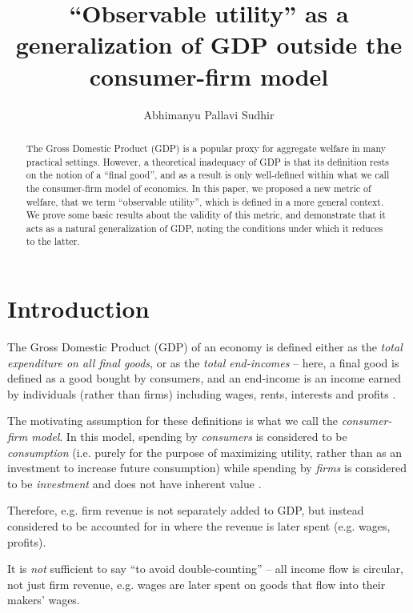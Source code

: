 \documentclass[smallextended]{svjour3}
\title{``Observable utility'' as a generalization of GDP outside the consumer-firm model}
\author{Abhimanyu Pallavi Sudhir}
\institute{Department of Mathematics, Imperial College London}
\begin{document}
\maketitle

\begin{abstract}
    The Gross Domestic Product (GDP) is a popular proxy for aggregate welfare in many practical settings. However, a theoretical inadequacy of GDP is that its definition rests on the notion of a ``final good'', and as a result is only well-defined within what we call the consumer-firm model of economics. In this paper, we proposed a new metric of welfare, that we term ``observable utility'', which is defined in a more general context. We prove some basic results about the validity of this metric, and demonstrate that it acts as a natural generalization of GDP, noting the conditions under which it reduces to the latter.
\end{abstract}

\section{Introduction}
\label{sec:intro}

The Gross Domestic Product (GDP) of an economy is defined either as the \emph{total expenditure on all final goods}, or as the \emph{total end-incomes} -- here, a final good is defined as a good bought by consumers, and an end-income is an income earned by individuals (rather than firms) including wages, rents, interests and profits \cite{bea}. 

The motivating assumption for these definitions is what we call the \emph{consumer-firm model}. In this model, spending by \emph{consumers} is considered to be \emph{consumption} (i.e. purely for the purpose of maximizing utility, rather than as an investment to increase future consumption) while spending by \emph{firms} is considered to be \emph{investment} and does not have inherent value \cite{firm}.

Therefore, e.g. firm revenue is not separately added to GDP, but instead considered to be accounted for in where the revenue is later spent (e.g. wages, profits).

\begin{note*}
    It is \emph{not} sufficient to say ``to avoid double-counting'' -- all income flow is circular, not just firm revenue, e.g. wages are later spent on goods that flow into their makers' wages.
\end{note*}
\end{document}
